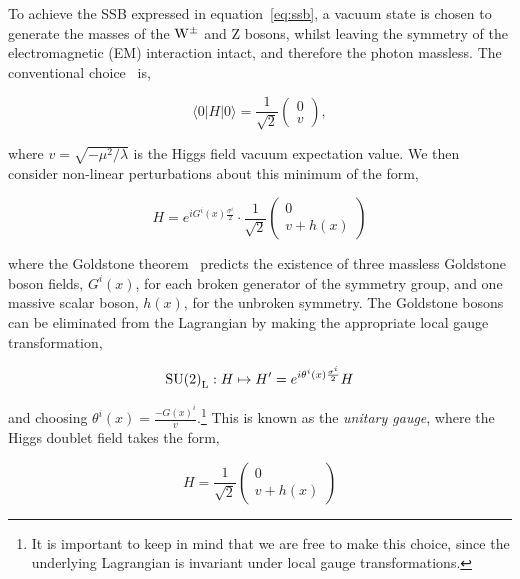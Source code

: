 \noindent
To achieve the SSB expressed in equation~\ref{eq:ssb}, a vacuum state is chosen to generate the masses of the ${\rm{W}}^\pm$ and Z bosons, whilst leaving the symmetry of the electromagnetic (EM) interaction intact, and therefore the photon massless. The conventional choice~\cite{Weinberg:1967tq} is,

\begin{equation}
    \langle 0 | H | 0 \rangle = \frac{1}{\sqrt{2}}\begin{pmatrix}
    0 \\
    v
    \end{pmatrix},
\end{equation}

\noindent
where $v=\sqrt{-\mu^2/\lambda}$ is the Higgs field vacuum expectation value. We then consider non-linear perturbations about this minimum of the form,

\begin{equation}
    H = e^{iG^i(x)\frac{\sigma^i}{2}} \cdot \frac{1}{\sqrt{2}}\begin{pmatrix}
    0 \\
    v + h(x)
    \end{pmatrix}
\end{equation}

\noindent
where the Goldstone theorem~\cite{Goldstone:1962es} predicts the existence of three massless Goldstone boson fields, $G^i(x)$, for each broken generator of the symmetry group, and one massive scalar boson, $h(x)$, for the unbroken symmetry. The Goldstone bosons can be eliminated from the Lagrangian by making the appropriate local gauge transformation,

\begin{equation}
    {\rm{SU}(2)}_{\rm{L}}: H \mapsto H' = e^{i\theta^i(x)\frac{\sigma^i}{2}}H
\end{equation}

\noindent
and choosing $\theta^i(x)=\frac{-G(x)^i}{v}$.\footnote{It is important to keep in mind that we are free to make this choice, since the underlying Lagrangian is invariant under local gauge transformations.} This is known as the \textit{unitary gauge}, where the Higgs doublet field takes the form,

\begin{equation}
    H = \frac{1}{\sqrt{2}}\begin{pmatrix}
    0 \\
    v + h(x)
    \end{pmatrix}
\end{equation}

